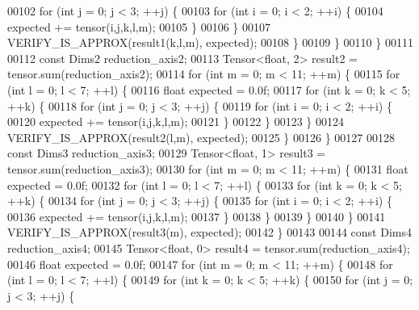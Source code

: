 \begin{DoxyCode}
00102         \textcolor{keywordflow}{for} (\textcolor{keywordtype}{int} j = 0; j < 3; ++j) \{
00103           \textcolor{keywordflow}{for} (\textcolor{keywordtype}{int} i = 0; i < 2; ++i) \{
00104             expected += tensor(i,j,k,l,m);
00105           \}
00106         \}
00107         VERIFY\_IS\_APPROX(result1(k,l,m), expected);
00108       \}
00109     \}
00110   \}
00111 
00112   \textcolor{keyword}{const} Dims2 reduction\_axis2;
00113   Tensor<float, 2> result2 = tensor.sum(reduction\_axis2);
00114   \textcolor{keywordflow}{for} (\textcolor{keywordtype}{int} m = 0; m < 11; ++m) \{
00115     \textcolor{keywordflow}{for} (\textcolor{keywordtype}{int} l = 0; l < 7; ++l) \{
00116       \textcolor{keywordtype}{float} expected = 0.0f;
00117       \textcolor{keywordflow}{for} (\textcolor{keywordtype}{int} k = 0; k < 5; ++k) \{
00118         \textcolor{keywordflow}{for} (\textcolor{keywordtype}{int} j = 0; j < 3; ++j) \{
00119           \textcolor{keywordflow}{for} (\textcolor{keywordtype}{int} i = 0; i < 2; ++i) \{
00120             expected += tensor(i,j,k,l,m);
00121           \}
00122         \}
00123       \}
00124       VERIFY\_IS\_APPROX(result2(l,m), expected);
00125     \}
00126   \}
00127 
00128   \textcolor{keyword}{const} Dims3 reduction\_axis3;
00129   Tensor<float, 1> result3 = tensor.sum(reduction\_axis3);
00130   \textcolor{keywordflow}{for} (\textcolor{keywordtype}{int} m = 0; m < 11; ++m) \{
00131     \textcolor{keywordtype}{float} expected = 0.0f;
00132     \textcolor{keywordflow}{for} (\textcolor{keywordtype}{int} l = 0; l < 7; ++l) \{
00133       \textcolor{keywordflow}{for} (\textcolor{keywordtype}{int} k = 0; k < 5; ++k) \{
00134         \textcolor{keywordflow}{for} (\textcolor{keywordtype}{int} j = 0; j < 3; ++j) \{
00135           \textcolor{keywordflow}{for} (\textcolor{keywordtype}{int} i = 0; i < 2; ++i) \{
00136             expected += tensor(i,j,k,l,m);
00137           \}
00138         \}
00139       \}
00140     \}
00141     VERIFY\_IS\_APPROX(result3(m), expected);
00142   \}
00143 
00144   \textcolor{keyword}{const} Dims4 reduction\_axis4;
00145   Tensor<float, 0> result4 = tensor.sum(reduction\_axis4);
00146   \textcolor{keywordtype}{float} expected = 0.0f;
00147   \textcolor{keywordflow}{for} (\textcolor{keywordtype}{int} m = 0; m < 11; ++m) \{
00148     \textcolor{keywordflow}{for} (\textcolor{keywordtype}{int} l = 0; l < 7; ++l) \{
00149       \textcolor{keywordflow}{for} (\textcolor{keywordtype}{int} k = 0; k < 5; ++k) \{
00150         \textcolor{keywordflow}{for} (\textcolor{keywordtype}{int} j = 0; j < 3; ++j) \{

\end{DoxyCode}
